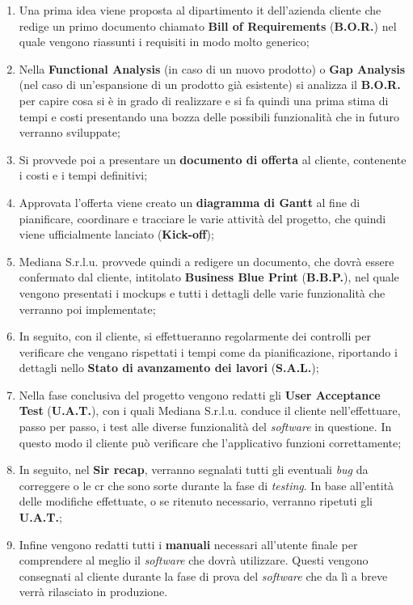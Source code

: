 \begin{enumerate}
\item Una prima idea viene proposta al dipartimento \acrshort{it} dell'azienda cliente che redige un primo documento chiamato \textbf{Bill of Requirements} (\textbf{B.O.R.}) nel quale vengono riassunti i requisiti in modo molto generico;
\item Nella \textbf{Functional Analysis} (in caso di un nuovo prodotto) o \textbf{Gap Analysis} (nel caso di un'espansione di un prodotto già esistente) si analizza il \textbf{B.O.R.} per capire cosa si è in grado di realizzare e si fa quindi una prima stima di tempi e costi presentando una bozza delle possibili funzionalità che in futuro verranno sviluppate;
\item Si provvede poi a presentare un \textbf{documento di offerta} al cliente, contenente i costi e i tempi definitivi;
\item Approvata l'offerta viene creato un \textbf{diagramma di Gantt} al fine di pianificare, coordinare e tracciare le varie attività del progetto, che quindi viene ufficialmente lanciato (\textbf{Kick-off});
\item Mediana S.r.l.u. provvede quindi a redigere un documento, che dovrà essere confermato dal cliente, intitolato \textbf{Business Blue Print} (\textbf{B.B.P.}), nel quale vengono presentati i \glspl{mockup} e tutti i dettagli delle varie funzionalità che verranno poi implementate;
\item In seguito, con il cliente, si effettueranno regolarmente dei controlli per verificare che vengano rispettati i tempi come da pianificazione, riportando i dettagli nello \textbf{Stato di avanzamento dei lavori} (\textbf{S.A.L.});
\item Nella fase conclusiva del progetto vengono redatti gli \textbf{User Acceptance Test} (\textbf{U.A.T.}), con i quali Mediana S.r.l.u. conduce il cliente nell'effettuare, passo per passo, i test alle diverse funzionalità del \textit{software} in questione. In questo modo il cliente può verificare che l'applicativo funzioni correttamente;
\item In seguito, nel \textbf{Sir recap}, verranno segnalati tutti gli eventuali \textit{bug} da correggere o le \acrshort{cr} che sono sorte durante la fase di \textit{testing}. In base all'entità delle modifiche effettuate, o se ritenuto necessario, verranno ripetuti gli \textbf{U.A.T.};
\item Infine vengono redatti tutti i \textbf{manuali} necessari all'utente finale per comprendere al meglio il \textit{software} che dovrà utilizzare. Questi vengono consegnati al cliente durante la fase di prova del \textit{software} che da lì a breve verrà rilasciato in produzione.
\end{enumerate}

